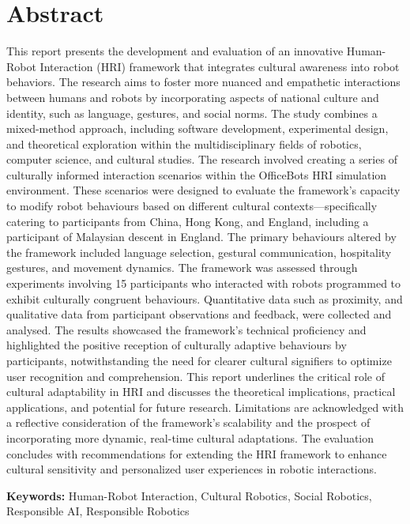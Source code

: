 
\chapter*{Abstract}

This report presents the development and evaluation of an innovative Human-Robot Interaction (HRI) framework that integrates cultural awareness into robot behaviors. The research aims to foster more nuanced and empathetic interactions between humans and robots by incorporating aspects of national culture and identity, such as language, gestures, and social norms. The study combines a mixed-method approach, including software development, experimental design, and theoretical exploration within the multidisciplinary fields of robotics, computer science, and cultural studies.
The research involved creating a series of culturally informed interaction scenarios within the OfficeBots HRI simulation environment. These scenarios were designed to evaluate the framework's capacity to modify robot behaviours based on different cultural contexts—specifically catering to participants from China, Hong Kong, and England, including a participant of Malaysian descent in England. The primary behaviours altered by the framework included language selection, gestural communication, hospitality gestures, and movement dynamics.
The framework was assessed through experiments involving 15 participants who interacted with robots programmed to exhibit culturally congruent behaviours. Quantitative data such as proximity, and qualitative data from participant observations and feedback, were collected and analysed. The results showcased the framework's technical proficiency and highlighted the positive reception of culturally adaptive behaviours by participants, notwithstanding the need for clearer cultural signifiers to optimize user recognition and comprehension.
This report underlines the critical role of cultural adaptability in HRI and discusses the theoretical implications, practical applications, and potential for future research. Limitations are acknowledged with a reflective consideration of the framework's scalability and the prospect of incorporating more dynamic, real-time cultural adaptations. The evaluation concludes with recommendations for extending the HRI framework to enhance cultural sensitivity and personalized user experiences in robotic interactions.

\textbf{Keywords:} Human-Robot Interaction, Cultural Robotics, Social Robotics, Responsible AI, Responsible Robotics